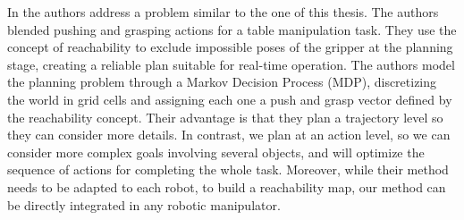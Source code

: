 

In \citep{coelhoplanning} the authors address a problem similar to the one of this thesis. The authors blended pushing and grasping actions for a table manipulation task.
They use the concept of reachability \citep{vahrenkamp2013robot} to exclude impossible poses of the gripper at the planning stage, creating a reliable plan suitable for real-time operation. The authors model the planning problem through a Markov Decision Process (MDP), discretizing the world in grid cells and assigning each one a push and grasp vector defined by the reachability concept. Their advantage is that they plan a trajectory level so they can consider more details. In contrast, we plan at an action level, so we can consider more complex goals involving several objects, and will optimize the sequence of actions for completing the whole task.
Moreover, while their method needs to be adapted to each robot, to build a reachability map, our method can be directly integrated in any robotic manipulator. 

